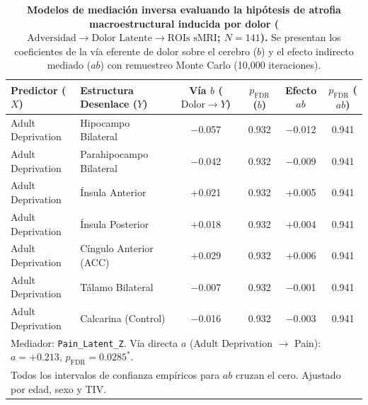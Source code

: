 \documentclass[11pt,a4paper]{article}
\begin{document}
\begin{table}[htbp]
\centering
\small
\caption{\textbf{Modelos de mediación inversa evaluando la hipótesis de atrofia macroestructural inducida por dolor ($\text{Adversidad} \to \text{Dolor Latente} \to \text{ROIs sMRI}$; $N = 141$).} Se presentan los coeficientes de la vía 
eferente de dolor sobre el cerebro ($b$) y el efecto indirecto mediado ($ab$) con remuestreo Monte Carlo (10,000 iteraciones).}
\label{tab:inverse_mediation}
\begin{tabular}{llcccc}
\toprule
\textbf{Predictor ($X$)} & \textbf{Estructura Desenlace ($Y$)} & \textbf{Vía $b$ ($\text{Dolor} \to Y$)} & \textbf{$p_{\text{FDR}}$ ($b$)} & \textbf{Efecto $ab$} & \textbf{$p_{\text{FDR}}$ ($ab$)} \\
\midrule
Adult Deprivation & Hipocampo Bilateral    & $-$0.057 & 0.932 & $-$0.012 & 0.941 \\
Adult Deprivation & Parahipocampo Bilateral & $-$0.042 & 0.932 & $-$0.009 & 0.941 \\
Adult Deprivation & Ínsula Anterior        & +0.021   & 0.932 & +0.005   & 0.941 \\
Adult Deprivation & Ínsula Posterior       & +0.018   & 0.932 & +0.004   & 0.941 \\
Adult Deprivation & Cíngulo Anterior (ACC) & +0.029   & 0.932 & +0.006   & 0.941 \\
Adult Deprivation & Tálamo Bilateral       & $-$0.007 & 0.932 & $-$0.001 & 0.941 \\
Adult Deprivation & Calcarina (Control)    & $-$0.016 & 0.932 & $-$0.003 & 0.941 \\
\bottomrule
\multicolumn{6}{l}{\footnotesize Mediador: \texttt{Pain\_Latent\_Z}. Vía directa $a$ (Adult Deprivation $\to$ Pain): $a = +0.213$, $p_{\text{FDR}} = 0.0285^*$.} \\
\multicolumn{6}{l}{\footnotesize Todos los intervalos de confianza empíricos para $ab$ cruzan el cero. Ajustado por edad, sexo y TIV.}
\end{tabular}
\end{table}
\end{document}
